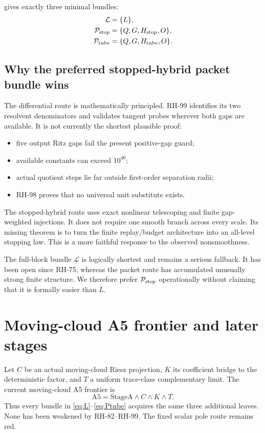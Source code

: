 \documentclass[11pt]{article}
\theoremstyle{definition}
\theoremstyle{remark}
\begin{document}
 gives exactly three minimal bundles:
\begin{align}
 \mathcal L&=\{L\},\label{eq:L}\\
 \mathcal P_{\rm stop}&=\{Q,G,H_{\rm stop},O\},\label{eq:Pstop}\\
 \mathcal P_{\rm tube}&=\{Q,G,H_{\rm tube},O\}.\label{eq:Ptube}
\end{align}

\subsection{Why the preferred stopped-hybrid packet bundle wins}

The differential route is mathematically principled.  RH-99 identifies its
two resolvent denominators and validates tangent probes wherever both gaps are
available.  It is not currently the shortest plausible proof:
\begin{itemize}[leftmargin=2em]
\item five output Ritz gaps fail the present positive-gap guard;
\item available constants can exceed $10^{40}$;
\item actual quotient steps lie far outside first-order separation radii;
\item RH-98 proves that no universal unit substitute exists.
\end{itemize}

The stopped-hybrid route uses exact nonlinear telescoping and finite
gap-weighted injections.  It does not require one smooth branch across every
scale.  Its missing theorem is to turn the finite replay/budget architecture
into an all-level stopping law.  This is a more faithful response to the
observed nonsmoothness.

The full-block bundle $\mathcal L$ is logically shortest and remains a serious
fallback.  It has been open since RH-75, whereas the packet route has
accumulated unusually strong finite structure.  We therefore prefer
$\mathcal P_{\rm stop}$ operationally without claiming that it is formally
easier than $L$.

\section{Moving-cloud A5 frontier and later stages}
\label{sec:A5}

Let $C$ be an actual moving-cloud Riesz projection, $K$ its coefficient
bridge to the deterministic factor, and $T$ a uniform trace-class
complementary limit.  The current moving-cloud A5 frontier is
\[
 \mathrm{A5}=\mathrm{StageA}\wedge C\wedge K\wedge T.
\]
Thus every bundle in \eqref{eq:L}--\eqref{eq:Ptube} acquires the same three
additional leaves.  None has been weakened by RH-82--RH-99.  The fixed scalar
pole route remains red.
\end{document}
